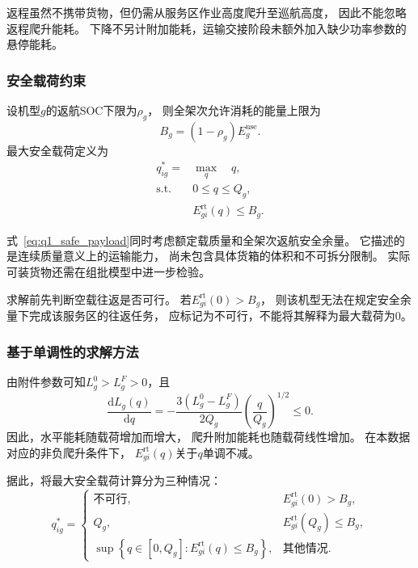 \documentclass[bwprint]{gmcmthesis}
\begin{document}
返程虽然不携带货物，但仍需从服务区作业高度爬升至巡航高度，
因此不能忽略返程爬升能耗。
下降不另计附加能耗，运输交接阶段未额外加入缺少功率参数的悬停能耗。

\subsubsection{安全载荷约束}

设机型$g$的返航SOC下限为$\rho_g$，
则全架次允许消耗的能量上限为
\begin{equation}
    B_g=(1-\rho_g)E_g^{\mathrm{use}}.
\end{equation}
最大安全载荷定义为
\begin{equation}
\begin{aligned}
    q_{ig}^{*}
    ={}&\max_q \quad q,\\
    \text{s.t.}\quad
    &0\leq q\leq Q_g,\\
    &E_{gi}^{\mathrm{rt}}(q)\leq B_g.
\end{aligned}
\label{eq:q1_safe_payload}
\end{equation}

式~\eqref{eq:q1_safe_payload}同时考虑额定载质量和全架次返航安全余量。
它描述的是连续质量意义上的运输能力，
尚未包含具体货箱的体积和不可拆分限制。
实际可装货物还需在组批模型中进一步检验。

求解前先判断空载往返是否可行。
若$E_{gi}^{\mathrm{rt}}(0)>B_g$，
则该机型无法在规定安全余量下完成该服务区的往返任务，
应标记为不可行，不能将其解释为最大载荷为0。

\subsubsection{基于单调性的求解方法}

由附件参数可知$L_g^0>L_g^F>0$，且
\begin{equation}
    \frac{\mathrm{d}L_g(q)}{\mathrm{d}q}
    =
    -\frac{3(L_g^0-L_g^F)}{2Q_g}
    \left(\frac{q}{Q_g}\right)^{1/2}
    \leq 0.
\end{equation}
因此，水平能耗随载荷增加而增大，
爬升附加能耗也随载荷线性增加。
在本数据对应的非负爬升条件下，
$E_{gi}^{\mathrm{rt}}(q)$关于$q$单调不减。

据此，将最大安全载荷计算分为三种情况：
\begin{equation}
    q_{ig}^{*}
    =
    \begin{cases}
        \text{不可行},
        &E_{gi}^{\mathrm{rt}}(0)>B_g,\\[3pt]
        Q_g,
        &E_{gi}^{\mathrm{rt}}(Q_g)\leq B_g,\\[3pt]
        \displaystyle
        \sup\left\{q\in[0,Q_g]:
        E_{gi}^{\mathrm{rt}}(q)\leq B_g\right\},
        &\text{其他情况}.
    \end{cases}
\end{equation}
\end{document}
